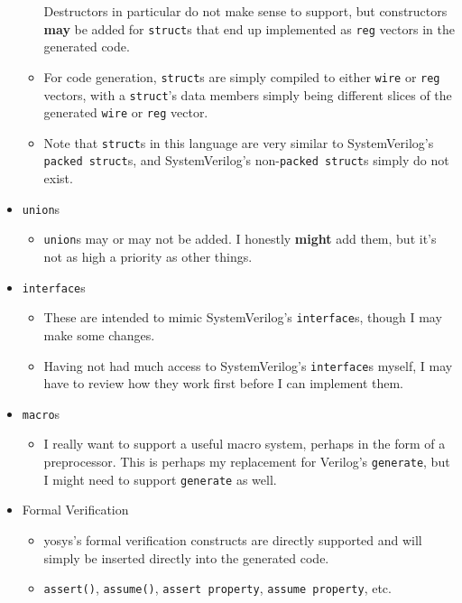 \documentclass{article}
\begin{document}
\begin{itemize}
\begin{itemize}
			Destructors in particular do not make sense to support, but
			constructors \textbf{may} be added for \texttt{struct}s that
			end up implemented as \texttt{reg} vectors in the generated
			code.
			\item For code generation, \texttt{struct}s are simply compiled
			to either \texttt{wire} or \texttt{reg} vectors, with a
			\texttt{struct}'s data members simply being different slices of
			the generated \texttt{wire} or \texttt{reg} vector.
			\item Note that \texttt{struct}s in this language are very
			similar to SystemVerilog's \texttt{packed struct}s, and
			SystemVerilog's non-\texttt{packed struct}s simply do not
			exist.
			\end{itemize}
		\item \texttt{union}s
			\begin{itemize}
			\item \texttt{union}s may or may not be added.  I honestly
			\textbf{might} add them, but it's not as high a priority as
			other things.
			\end{itemize}
		\item \texttt{interface}s
			\begin{itemize}
			\item These are intended to mimic SystemVerilog's
			\texttt{interface}s, though I may make some changes.
			\item Having not had much access to SystemVerilog's
			\texttt{interface}s myself, I may have to review how they work
			first before I can implement them.
			\end{itemize}
		\item \texttt{macro}s
			\begin{itemize}
			\item I really want to support a useful macro system, perhaps
			in the form of a preprocessor.  This is perhaps my replacement
			for Verilog's \texttt{generate}, but I might need to support
			\texttt{generate} as well.
			\end{itemize}
		\item Formal Verification
			\begin{itemize}
			\item yosys's formal verification constructs are directly
			supported and will simply be inserted directly into the
			generated code.
			\item \texttt{assert()}, \texttt{assume()},
			\texttt{assert property}, \texttt{assume property}, etc.
			\end{itemize}
		\end{itemize}
\end{document}
